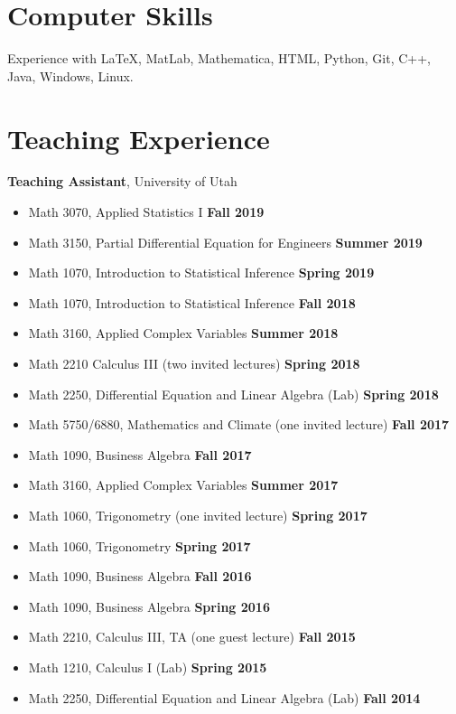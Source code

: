 \documentclass[margin,line]{res}
\begin{document}
\begin{resume}
\section{\sc Computer Skills} 
Experience with \LaTeX, MatLab, Mathematica, HTML, Python, Git, C++, Java, Windows, Linux.

\section{\sc Teaching Experience}
{\bf Teaching Assistant}, University of Utah
\vspace*{.05in}
\begin{itemize}
\item[ ] Math 3070, Applied Statistics I \hfill {\bf Fall 2019}
\item[ ] Math 3150, Partial Differential Equation for Engineers \hfill {\bf Summer 2019}
\item[ ] Math 1070, Introduction to Statistical Inference \hfill {\bf Spring 2019}
\item[ ] Math 1070, Introduction to Statistical Inference \hfill {\bf Fall 2018}
\item[ ] Math 3160, Applied Complex Variables \hfill {\bf Summer 2018}
\item[ ] Math 2210 Calculus III (two invited lectures) \hfill {\bf Spring 2018}
\item[ ] Math 2250, Differential Equation and Linear Algebra (Lab) \hfill {\bf Spring 2018}
\item[ ] Math 5750/6880, Mathematics and Climate (one invited lecture) \hfill {\bf Fall 2017}
\item[ ] Math 1090, Business Algebra \hfill {\bf Fall 2017}
\item[ ] Math 3160, Applied Complex Variables \hfill {\bf Summer 2017}
\item[ ] Math 1060, Trigonometry (one invited lecture) \hfill {\bf Spring 2017}
\item[ ] Math 1060, Trigonometry \hfill {\bf Spring 2017}
\item[ ] Math 1090, Business Algebra \hfill {\bf Fall 2016}
\item[ ] Math 1090, Business Algebra \hfill {\bf Spring 2016}
\item[ ] Math 2210, Calculus III, TA (one guest lecture) \hfill {\bf Fall 2015}
\item[ ] Math 1210, Calculus I (Lab) \hfill {\bf Spring 2015}
\item[ ] Math 2250, Differential Equation and Linear Algebra (Lab) \hfill {\bf Fall 2014}
\end{itemize}

\end{resume}
\end{document}
